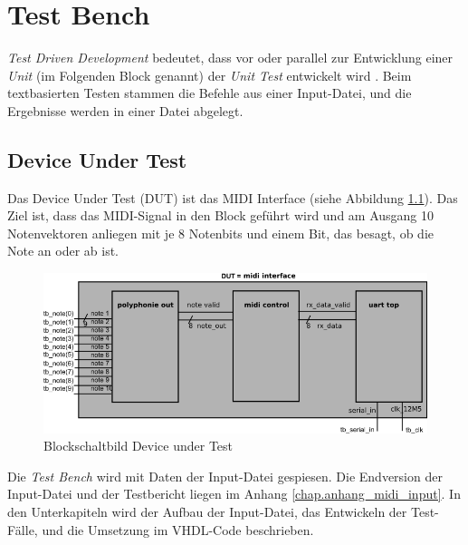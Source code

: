 
\chapter{Test Bench}\label{chap.testen}

\textit{Test Driven Development} bedeutet, dass vor oder parallel zur Entwicklung einer \textit{Unit} (im Folgenden Block genannt) der \textit{Unit Test} entwickelt wird \citep{Test Driven}. Beim textbasierten Testen stammen die Befehle aus einer Input-Datei, und die Ergebnisse werden in einer Datei abgelegt. 

\section{Device Under Test}\label{sec.testbench_DUT}

Das Device Under Test (DUT) ist das MIDI Interface (siehe Abbildung \ref{fig.testbench}). Das Ziel ist, dass das MIDI-Signal in den Block geführt wird und am Ausgang 10 Notenvektoren anliegen mit je 8 Notenbits und einem Bit, das besagt, ob die Note an oder ab ist.

\begin{figure}[H]
	\includegraphics[width=1\textwidth]{images/midi_interface/testbench_midiinterface.png}
	\caption{Blockschaltbild Device under Test}
	\label{fig.testbench}
\end{figure} 

Die \textit{Test Bench} wird mit Daten der Input-Datei gespiesen. Die Endversion der Input-Datei und der Testbericht liegen im Anhang \ref{chap.anhang_midi_input}. 
In den Unterkapiteln wird der Aufbau der Input-Datei, das Entwickeln der Test-Fälle, und die Umsetzung im VHDL-Code beschrieben.


